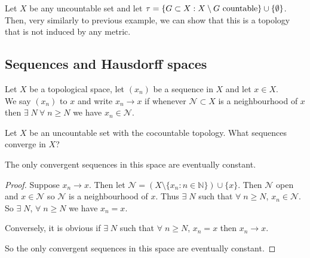 \begin{example}
    Let $X$ be any uncountable set and let $\tau = \{G\subset X : X \setminus G \textup{ countable} \} \cup \{\emptyset\}$. Then, very similarly to previous example, we can show that this is a topology that is not induced by any metric.
\end{example}

\subsection{Sequences and Hausdorff spaces}

\begin{definition}[Convergence]
Let $X$ be a topological space, let $(x_n)$ be a sequence in $X$ and let $x\in X$. \\
We say $(x_n)$  to $x$ and write $x_n \to x$ if whenever $\mathcal{N}\subset X$ is a neighbourhood of $x$ then $\exists \; N \ \forall \; n \geq N$ we have $x_n \in \mathcal{N}$.
\end{definition}


\begin{example}
    Let $X$ be an uncountable set with the cocountable topology. What sequences converge in $X$?

    The only convergent sequences in this space are eventually constant.

    \begin{proof}
    Suppose $x_n \to x$. Then let $\mathcal{N} = (X \setminus \{x_n : n \in \mathbb{N}\})\cup\{x\}$. Then $\mathcal{N}$ open and $x\in \mathcal{N}$ so $\mathcal{N}$ is a neighbourhood of $x$. Thus $\exists \; N$ such that $\forall \; n \geq N$, $x_n\in \mathcal{N}$. So $\exists \; N$, $\forall \; n \geq N$ we have $x_n=x$.

    Conversely, it is obvious if $\exists \; N$ such that $\forall \; n \geq N$, $x_n=x$ then $x_n \to x$.

    So the only convergent sequences in this space are eventually constant.
    \end{proof}
\end{example}

